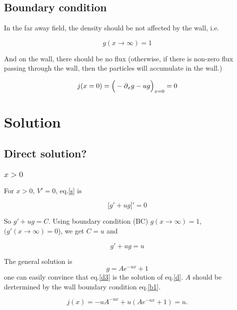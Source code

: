 \documentclass{../Templetes/1c}
\begin{document}
\subsection{Boundary condition}
In the far away field, the density should be not affected by the wall, i.e.

\begin{equation}\label{b1}
  g(x\rightarrow\infty)=1
\end{equation}

And on the wall, there should be no flux (otherwise, if there is non-zero flux passing through the wall, 
then the particles will accumulate in the wall.)

\begin{equation} \label{b2}
j(x=0)=\Big(-\partial_x g-ug\Big)_{x=0}=0
\end{equation}

\section{Solution}




\subsection{Direct solution?}

\subsubsection{$x>0$}
For $x>0$, $V'=0$, eq.\eqref{s} is 

\begin{equation} \label{d}
\big[
g'+ug
\big]'=0
\end{equation}

So $g'+ug=C$. Using boundary condition (BC) $g(x\rightarrow \infty)=1$, 
$(g'(x\rightarrow\infty)=0$), we get $C=u$ and 

\begin{equation} \label{d2}
g'+ug=u
\end{equation}

The general solution is
\begin{equation} \label{d3}
g=Ae^{-ux}+1
\end{equation}
one can easily convince that eq.\eqref{d3} is the solution of eq.\eqref{d}. 
$A$ should be dertermined by the wall boundary condition eq.\eqref{b1}.

\begin{equation}
    j(x)=-uA^{-ux}+u(Ae^{-ux}+1)=u. 
\end{equation}
\end{document}
